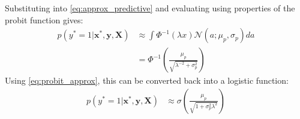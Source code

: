 \documentclass[a4paper]{article}
\begin{document}
    Substituting into \autoref{eq:approx_predictive} and evaluating using properties of the probit function gives:
    \begin{align}
         p(y^* = 1 | \bm{x}^*, \bm{y}, \bm{X}) &\approx \int \Phi^{-1}(\lambda x) \mathcal{N}(a; \mu_p, \sigma_p) da \nonumber \\
        &= \Phi^{-1}\left(\frac{\mu_p}{\sqrt{\lambda^{-2} + \sigma_p^2}}\right)
     \end{align}
    Using \autoref{eq:probit_approx}, this can be converted back into a logistic function:
    \begin{align}
        \label{eq:predictive_distribution}
         p(y^* = 1 | \bm{x}^*, \bm{y}, \bm{X}) &\approx \sigma\left(\frac{\mu_p}{\sqrt{1 + \sigma_p^2\lambda^2}}\right)
    \end{align}
\end{document}
